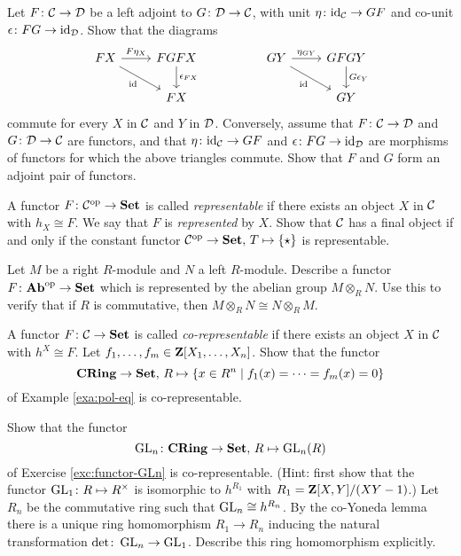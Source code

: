 \begin{exercise}
Let $F\colon {\mathcal{C}} \to {\mathcal{D}}$ be a left adjoint to $G\colon {\mathcal{D}} \to {\mathcal{C}}$, with unit $\eta\colon {\rm id}_{\mathcal{C}} \to GF$ and co-unit $\epsilon\colon FG \to {\rm id}_{\mathcal{D}}$. Show that the diagrams
\[
\begin{tikzcd}
FX \arrow{r}{F\eta_X} \arrow[swap]{rd}{\id} & FGFX \arrow{d}{\epsilon_{FX}} 
	& & GY \arrow{r}{\eta_{GY}} \arrow[swap]{rd}{\id} & GFGY \arrow{d}{G\epsilon_Y} \\
& FX & & & GY 
\end{tikzcd}
\]
commute for every $X$ in ${\mathcal{C}}$ and $Y$ in ${\mathcal{D}}$. Conversely, assume that  $F\colon {\mathcal{C}} \to {\mathcal{D}}$ and $G\colon {\mathcal{D}} \to {\mathcal{C}}$
are functors, and that  $\eta\colon {\rm id}_{\mathcal{C}} \to GF$ and $\epsilon\colon FG \to {\rm id}_{\mathcal{D}}$ are morphisms of functors for which the above triangles commute. Show that $F$ and $G$ form an adjoint pair of functors.
\end{exercise}

\begin{exercise}
A functor $F\colon {\mathcal{C}}^{\mathrm{op}} \to \mathbf{Set}$ is called \emph{representable} if there exists an object $X$ in ${\mathcal{C}}$ with $h_X \cong F$. We say that $F$ is \emph{represented} by $X$. Show that ${\mathcal{C}}$ has a final object if and only if the constant functor ${\mathcal{C}}^{\mathrm{op}} \to \mathbf{Set},\, T\mapsto \{\star\}$ is representable. 
\end{exercise}

\begin{exercise}
Let $M$ be a right $R$-module and $N$ a left $R$-module. Describe a functor $F\colon \mathbf{Ab}^{\mathrm{op}} \to \mathbf{Set}$ which is represented by the abelian group $M\otimes_R N$. Use this to verify that if $R$ is commutative, then $M\otimes_R N \cong N\otimes_R M$.
\end{exercise}


\begin{exercise}
A functor $F\colon {\mathcal{C}}\to \mathbf{Set}$ is called \emph{co-representable} if there exists an object $X$ in ${\mathcal{C}}$ with $h^X\cong F$. 
Let $f_1,\ldots, f_m \in {\mathbf{Z}}[X_1,\ldots,X_n]$. Show that the functor
\[
	\mathbf{CRing} \to \mathbf{Set},\, R \mapsto \{ x\in R^n \mid f_1(x)=\cdots=f_m(x)=0 \}
\]
of Example \ref{exa:pol-eq} is co-representable.
\end{exercise}

\begin{exercise}[$\star$]
Show that the functor
\[
	\operatorname{GL}_n\colon \mathbf{CRing} \to \mathbf{Set},\, R \mapsto \operatorname{GL}_n(R)
\]
of Exercise \ref{exc:functor-GLn} is co-representable. (Hint: first show that the functor $\operatorname{GL}_1\colon R \mapsto R^\times$ is isomorphic to $h^{R_1}$ with $R_1={\mathbf{Z}}[X,Y]/(XY-1)$.) Let $R_n$ be the commutative ring such that $\operatorname{GL}_n \cong h^{R_n}$. By the co-Yoneda lemma there is a unique ring homomorphism
$R_1\to R_n$ inducing the natural transformation $\det\colon \operatorname{GL}_n\to \operatorname{GL}_1$. Describe  this ring homomorphism explicitly. 
\end{exercise}

